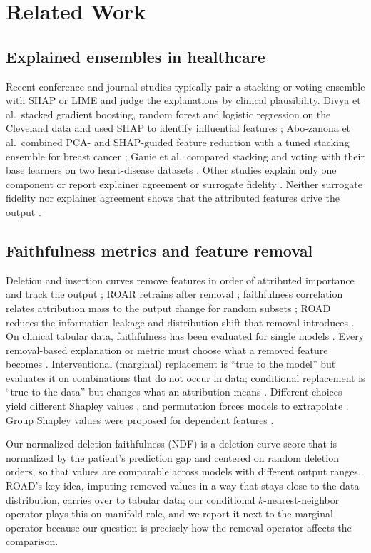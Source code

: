 \section{Related Work}
\subsection{Explained ensembles in healthcare}
Recent conference and journal studies typically pair a stacking or voting ensemble with SHAP or LIME and judge the explanations by clinical plausibility. Divya et al.\ stacked gradient boosting, random forest and logistic regression on the Cleveland data and used SHAP to identify influential features \cite{divya}; Abo-zanona et al.\ combined PCA- and SHAP-guided feature reduction with a tuned stacking ensemble for breast cancer \cite{abozanona}; Ganie et al.\ compared stacking and voting with their base learners on two heart-disease datasets \cite{ganie}. Other studies explain only one component \cite{wolak,adekoya} or report explainer agreement \cite{sahin} or surrogate fidelity \cite{zarepour}. Neither surrogate fidelity nor explainer agreement shows that the attributed features drive the output \cite{krishna}.

\subsection{Faithfulness metrics and feature removal}
Deletion and insertion curves remove features in order of attributed importance and track the output \cite{petsiuk}; ROAR retrains after removal \cite{hooker}; faithfulness correlation relates attribution mass to the output change for random subsets \cite{bhatt}; ROAD reduces the information leakage and distribution shift that removal introduces \cite{rong}. On clinical tabular data, faithfulness has been evaluated for single models \cite{qureshi,ababneh}. Every removal-based explanation or metric must choose what a removed feature becomes \cite{covert}. Interventional (marginal) replacement is ``true to the model'' but evaluates it on combinations that do not occur in data; conditional replacement is ``true to the data'' but changes what an attribution means \cite{chen,janzing,frye,aas}. Different choices yield different Shapley values \cite{sundararajan,kumar}, and permutation forces models to extrapolate \cite{hooker_mentch}. Group Shapley values were proposed for dependent features \cite{jullum_group}.

Our normalized deletion faithfulness (NDF) is a deletion-curve score that is normalized by the patient's prediction gap and centered on random deletion orders, so that values are comparable across models with different output ranges. ROAD's key idea, imputing removed values in a way that stays close to the data distribution, carries over to tabular data; our conditional $k$-nearest-neighbor operator plays this on-manifold role, and we report it next to the marginal operator because our question is precisely how the removal operator affects the comparison.

